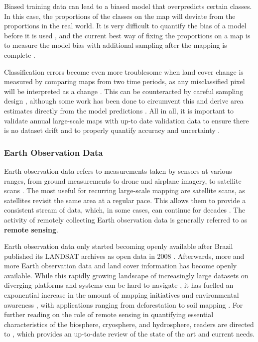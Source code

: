         Biased training data can lead to a biased model that overpredicts certain classes. In this case, the proportions of the classes on the map will deviate from the proportions in the real world. It is very difficult to quantify the bias of a model before it is used \citep{stehman2013estimating}, and the current best way of fixing the proportions on a map is to measure the model bias with additional sampling after the mapping is complete \citep{stehman2014estimating}.

        Classification errors become even more troublesome when land cover change is measured by comparing maps from two time periods, as any misclassified pixel will be interpreted as a change \citep{olofsson2013making}. This can be counteracted by careful sampling design \citep{stehman2012impact,olofsson2014good}, although some work has been done to circumvent this and derive area estimates directly from the model predictions \citep{sales2022land,kleinewillinghofer2022unbiased,angelopoulos2023predictionpowered}.
        All in all, it is important to validate annual large-scale maps with up-to date validation data to ensure there is no dataset drift and to properly quantify accuracy and uncertainty \citep{tsendbazar2021towards}.

    \subsubsection{Earth Observation Data}

        Earth observation data refers to measurements taken by sensors at various ranges, from ground measurements \citep{shahi2015novel} to drone \citep{tang2015drone} and airplane \citep{mastelic2020aerial} imagery, to satellite scans \citep{phiri2020sentinel}. The most useful for recurring large-scale mapping are satellite scans, as satellites revisit the same area at a regular pace. This allows them to provide a consistent stream of data, which, in some cases, can continue for decades \citep{xiong2020modis,wulder2022fifty}. The activity of remotely collecting Earth observation data is generally referred to as \textbf{remote sensing}.

        Earth observation data only started becoming openly available after Brazil published its LANDSAT archives as open data in 2008 \citep{nature2008markets}. Afterwards, more and more Earth observation data and land cover information has become openly available. While this rapidly growing landscape of increasingly large datasets on diverging platforms and systems can be hard to navigate \citep{wagemann2021a}, it has fuelled an exponential increase in the amount of mapping initiatives and environmental awareness \citep{wulder2022fifty}, with applications ranging from deforestation \citep{hansen2013high} to soil mapping \citep{hengl2017soilgrids250m}. For further reading on the role of remote sensing in quantifying essential characteristics of the biosphere, cryosphere, and hydrosphere, readers are directed to \citet{radeloff2024need}, which provides an up-to-date review of the state of the art and current needs.
        
